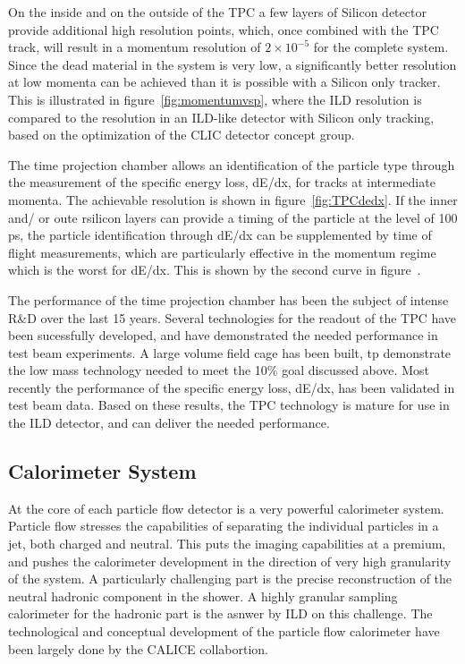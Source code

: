 \documentclass[%
 preprint,
 amsmath,amssymb,
 aps,
]{revtex4-1}
\begin{document}
On the inside and on the outside of the TPC a few layers of Silicon detector provide additional high resolution points, which, once combined with the TPC track, will result in a momentum resolution of $2 \times 10^{-5}$ for the complete system. Since the dead material in the system is very low, a significantly better resolution at low momenta can be achieved than it is possible with a Silicon only tracker. This is illustrated in figure~\ref{fig:momentumvsp}, where the ILD resolution is compared to the resolution in an ILD-like detector with Silicon only tracking, based on the optimization of the CLIC detector concept group. 

The time projection chamber allows an identification of the particle type through the measurement of the specific energy loss, dE/dx, for tracks at intermediate momenta. The achievable resolution is shown in figure~\ref{fig:TPCdedx}. If the inner and/ or oute rsilicon layers can provide a timing of the particle at the level of 100 ps, the particle identification through dE/dx can be supplemented by time of flight measurements, which are particularly effective in the momentum regime which is the worst for dE/dx. This is shown by the second curve in figure~. 

The performance of the time projection chamber has been the subject of intense R\&D over the last 15 years. Several technologies for the readout of the TPC have been sucessfully developed, and have demonstrated the needed performance in test beam experiments. A large volume field cage has been built, tp demonstrate the low mass technology needed to meet the 10\% goal discussed above. Most recently the performance of the specific energy loss, dE/dx, has been validated in test beam data. Based on these results, the TPC technology is mature for use in the ILD detector, and can deliver the needed performance. 


\subsection{Calorimeter System}
At the core of each particle flow detector is a very powerful calorimeter system. Particle flow stresses the capabilities of separating the individual particles in a jet, both charged and neutral. This puts the imaging capabilities at a premium, and pushes the calorimeter development in the direction of very high granularity of the system. A particularly challenging part is the precise reconstruction of the neutral hadronic component in the shower. A highly granular sampling calorimeter for the hadronic part is the asnwer by ILD on this challenge. The technological and conceptual development of the particle flow calorimeter have been largely done by the CALICE collabortion. 
\end{document}
